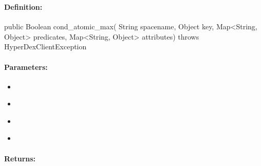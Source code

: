 \subsubsection{}
\label{api:java:cond_atomic_max}


\paragraph{Definition:}
\begin{javacode}
public Boolean cond_atomic_max(
        String spacename,
        Object key,
        Map<String, Object> predicates,
        Map<String, Object> attributes) throws HyperDexClientException
\end{javacode}

\paragraph{Parameters:}
\begin{itemize}[noitemsep]
\item {}\\

\item {}\\

\item {}\\

\item {}\\

\end{itemize}

\paragraph{Returns:}


\pagebreak
\subsubsection{}
\label{api:java:async_cond_atomic_max}


